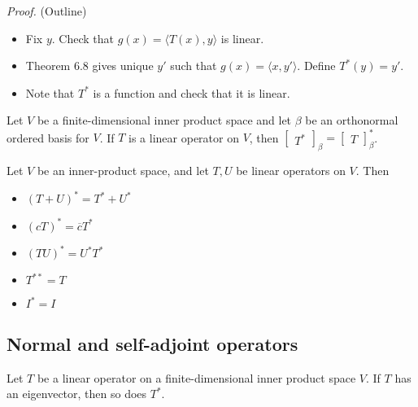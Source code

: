 \documentclass[12pt]{article}
\newenvironment{lemma}[2][Lemma]{\begin{trivlist}
\item[\hskip \labelsep {\bfseries #1}\hskip \labelsep {\bfseries #2.}]}{\end{trivlist}}
\newenvironment{theorem}[2][Theorem]{\begin{trivlist}
\item[\hskip \labelsep {\bfseries #1}\hskip \labelsep {\bfseries #2.}]}{\end{trivlist}}
\begin{document}
\textit{Proof.} (Outline)

\begin{itemize}
    \item Fix $y$. Check that $g(x) = \langle T(x), y \rangle$ is linear.
    
    \item Theorem 6.8 gives unique $y'$ such that $g(x) = \langle x, y' \rangle$. Define $T^*(y) = y'$.
    
    \item Note that $T^*$ is a function and check that it is linear.
\end{itemize}

\begin{theorem}{6.10}
Let $V$ be a finite-dimensional inner product space and let $\beta$ be an orthonormal ordered basis for $V$. If $T$ is a linear operator on $V$, then $\begin{bmatrix}
T^*
\end{bmatrix}_\beta = \begin{bmatrix}
T
\end{bmatrix}_\beta^*$.
\end{theorem}

\begin{theorem}{6.11}
Let $V$ be an inner-product space, and let $T,U$ be linear operators on $V$. Then

\begin{itemize}
    \item[(a)] $(T + U)^* = T^* + U^*$
    
    \item[(b)] $(cT)^* = \overline{c}T^*$
    
    \item[(c)] $(TU)^* = U^*T^*$
    
    \item[(d)] $T^{**} = T$
    
    \item[(e)] $I^* = I$
\end{itemize}
\end{theorem}

\subsection{Normal and self-adjoint operators}

\begin{lemma}{15}
Let $T$ be a linear operator on a finite-dimensional inner product space $V$. If $T$ has an eigenvector, then so does $T^*$.
\end{lemma}
\end{document}
